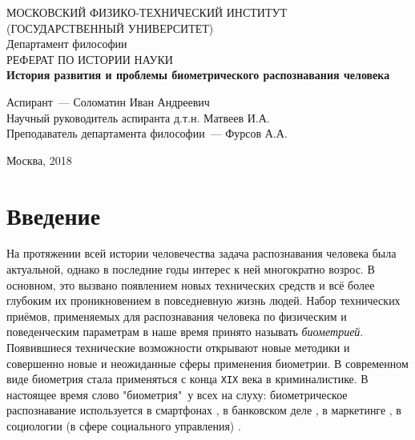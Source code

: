 \documentclass[14pt, a4paper]{extarticle}
\begin{document}
	\begin{titlepage}
		\begin{center}
			\hfill \break
			МОСКОВСКИЙ ФИЗИКО-ТЕХНИЧЕСКИЙ ИНСТИТУТ\\ (ГОСУДАРСТВЕННЫЙ УНИВЕРСИТЕТ)\\
			\hfill \break
			\hfill \break
			\hfill \break
			\hfill \break
			\hfill \break
			Департамент философии\\
			\hfill \break
			\hfill \break
			РЕФЕРАТ ПО ИСТОРИИ НАУКИ\\
			\hfill \break
			\hfill \break
			\large{\textbf{История развития и проблемы биометрического распознавания человека}}\\
			\hfill \break		
		\end{center}
		
		\begin{center}
			\hfill \break
			\parbox{0.9\textwidth}
			{
				Аспирант~--- Соломатин Иван Андреевич \\
				Научный руководитель аспиранта \underline{\hspace{3cm}} д.т.н. Матвеев И.А. \\
				Преподаватель департамента философии~--- Фурсов А.А. \\
			}
		\end{center}
		\hfill \break
		\hfill \break
		\hfill \break
		\hfill \break
		\begin{center} Москва, 2018 
		\end{center}
		\thispagestyle{empty} 
	\end{titlepage}
	
\tableofcontents
\newpage

\section{Введение}
На протяжении всей истории человечества задача распознавания человека была актуальной, однако в последние годы интерес к ней многократно возрос. В основном, это вызвано появлением новых технических средств и всё более глубоким их проникновением в повседневную жизнь людей. Набор технических приёмов, применяемых для распознавания человека по физическим и поведенческим параметрам в наше время принято называть \textit{биометрией}. Появившиеся технические возможности открывают новые методики и совершенно новые и неожиданные сферы применения биометрии. В современном виде биометрия стала применяться с конца \texttt{XIX} века в криминалистике. В настоящее время слово "биометрия"\ у всех на слуху: биометрическое распознавание используется в смартфонах \cite{odinokikh2018high, sezan2014user, hwang2009keystroke}, в банковском деле \cite{fatima2011banking, venkatraman2008biometrics}, в маркетинге \cite{?},
в социологии (в сфере социального управления) \cite{?}.
\end{document}
